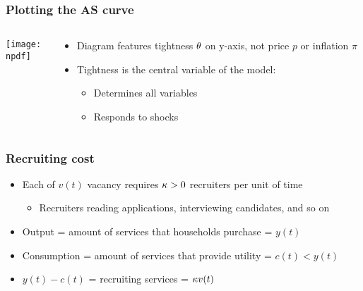\documentclass[11pt,aspectratio=169,xcolor={dvipsnames},hyperref={pdftex,pdfpagemode=UseNone,hidelinks,pdfdisplaydoctitle=true},usepdftitle=false]{beamer}
\newcommand{\npdf}{../figures/figures3.pdf}
\begin{document}
\begin{frame}
\frametitle{Plotting the AS curve}
\begin{columns}
\begin{column}{0.6\textwidth}
\texttt{[image: \\npdf]}%
\end{column}
\begin{column}{0.4\textwidth}
\begin{itemize}
	\item Diagram features tightness $\theta$ on y-axis, not price $p$ or inflation $\pi$
	\item Tightness is the central variable of the model:
	\begin{itemize}
	\item Determines all variables
	\item Responds to shocks
	\end{itemize}
\end{itemize}
\end{column}  
\end{columns}
\end{frame}

\begin{frame}
\end{frame}
	
\begin{frame}
\frametitle{Recruiting cost}
\begin{itemize}
\item Each of $v(t)$ vacancy requires $\kappa>0$ recruiters per unit of time
\begin{itemize}
\item Recruiters reading applications, interviewing candidates, and so on
\end{itemize}
\item Output = amount of services that households purchase = $y(t)$
\item Consumption = amount of services that provide utility = $c(t)< y(t)$
\item $y(t) - c(t)$ = recruiting services = $\kappa v(t)$
\end{itemize}	
\end{frame}
\end{document}
